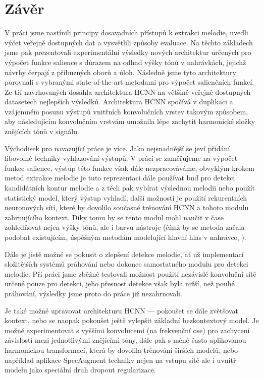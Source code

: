 \chapter*{Závěr}

V práci jsme nastínili principy dosavadních přístupů k extrakci melodie, uvedli výčet veřejně dostupných dat a vysvětlili způsoby evaluace. Na těchto základech jsme pak prezentovali experimentální výsledky nových architektur určených pro výpočet funkce salience s důrazem na odhad výšky tónů v nahrávkách, jejichž návrhy čerpají z příbuzných oborů a úloh. Následně jsme tyto architektury porovnali s vybranými state-of-the-art metodami pro výpočet salienčních funkcí. Ze tří navrhovaných dosáhla architektura HCNN na většině veřejně dostupných datasetech nejlepších výsledků. Architektura HCNN spočívá v duplikaci a vzájemném posunu výstupů vnitřních konvolučních vrstev takovým způsobem, aby následujícím konvolučním vrstvám umožnila lépe zachytit harmonické složky znějících tónů v signálu.

Východisek pro navazující práce je více. Jako nejsnadnější se jeví přidání libovolné techniky vyhlazování výstupů. V práci se zaměřujeme na výpočet funkce salience, výstup této funkce však dále nezpracováváme, obvyklým krokem metod extrakce melodie je tuto reprezentaci dále používat buď pro detekci kandidátních kontur melodie a z těch pak vybírat výslednou melodii nebo použít statistický model, který výstup vyhladí, další možností je použití rekurentních neuronových sítí, které by dovolilo současné trénování HCNN a tohoto modulu zahrnujícího kontext. Díky tomu by se tento modul mohl naučit v čase zohledňovat nejen výšky tónů, ale i barvu nástroje (čímž by se metoda začala podobat existujícím, úspěšným metodám modelující hlavní hlas v nahrávce, \cite{Durrieu2011a}). 

Dále je jistě možné se pokusit o zlepšení detekce melodie, ať už implementací složitějších systémů práhování nebo dokonce samostatného modulu pro detekci melodie. Při práci jsme zběžně testovali možnost použití nezávislé konvoluční sítě určené pouze pro detekci, jeho přesnost detekce však byla nižší, než pouhé práhování, výsledky jsme proto do práce již nezahrnovali. 

Je také možné upravovat architekturu HCNN --- pokoušet se dále zvětšovat kontext, nebo se naopak pokoušet ještě vylepšit základní bezkontextový model. Je možné experimentovat s vyššími konvolucemi (na frekvenční ose) pro zachycení závislostí mezi jednotlivými znějícími tóny, dále pak s méně často aplikovanou harmonickou transformací, která by dovolila trénování širších modelů, nebo například aplikace SpecAugment techniky nejen na vstupu sítě ale i uvnitř modelu jako speciální druh dropout regularizace. 

